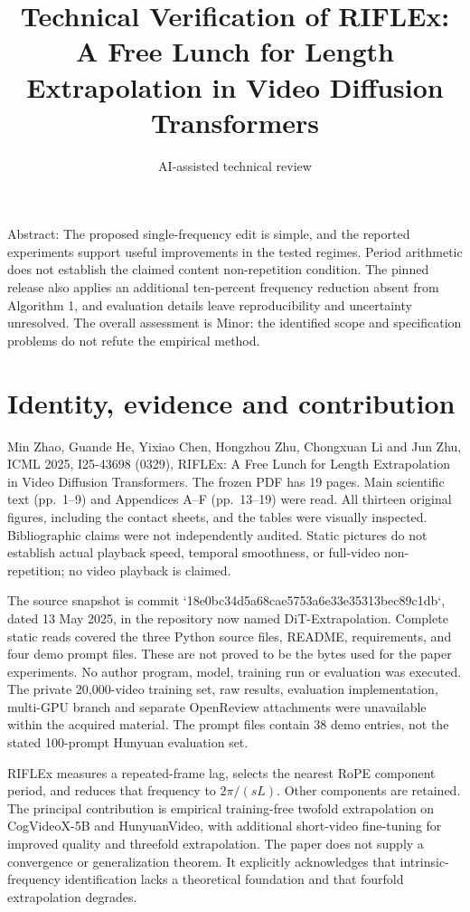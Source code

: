 \documentclass[10pt]{article}
\title{Technical Verification of RIFLEx: A Free Lunch for Length Extrapolation in Video Diffusion Transformers}
\author{AI-assisted technical review}
\date{}
\begin{document}
\maketitle
Abstract: The proposed single-frequency edit is simple, and the reported experiments support useful improvements in the tested regimes. Period arithmetic does not establish the claimed content non-repetition condition. The pinned release also applies an additional ten-percent frequency reduction absent from Algorithm 1, and evaluation details leave reproducibility and uncertainty unresolved. The overall assessment is Minor: the identified scope and specification problems do not refute the empirical method.\par
\section*{Identity, evidence and contribution}
Min Zhao, Guande He, Yixiao Chen, Hongzhou Zhu, Chongxuan Li and Jun Zhu, ICML 2025, I25-43698 (0329), RIFLEx: A Free Lunch for Length Extrapolation in Video Diffusion Transformers. The frozen PDF has 19 pages. Main scientific text (pp. 1–9) and Appendices A–F (pp. 13–19) were read. All thirteen original figures, including the contact sheets, and the tables were visually inspected. Bibliographic claims were not independently audited. Static pictures do not establish actual playback speed, temporal smoothness, or full-video non-repetition; no video playback is claimed.\par
The source snapshot is commit `18e0bc34d5a68cae5753a6e33e35313bec89c1db`, dated 13 May 2025, in the repository now named DiT-Extrapolation. Complete static reads covered the three Python source files, README, requirements, and four demo prompt files. These are not proved to be the bytes used for the paper experiments. No author program, model, training run or evaluation was executed. The private 20,000-video training set, raw results, evaluation implementation, multi-GPU branch and separate OpenReview attachments were unavailable within the acquired material. The prompt files contain 38 demo entries, not the stated 100-prompt Hunyuan evaluation set.\par
RIFLEx measures a repeated-frame lag, selects the nearest RoPE component period, and reduces that frequency to \(2\pi/(sL)\). Other components are retained. The principal contribution is empirical training-free twofold extrapolation on CogVideoX-5B and HunyuanVideo, with additional short-video fine-tuning for improved quality and threefold extrapolation. The paper does not supply a convergence or generalization theorem. It explicitly acknowledges that intrinsic-frequency identification lacks a theoretical foundation and that fourfold extrapolation degrades.\par
\end{document}
